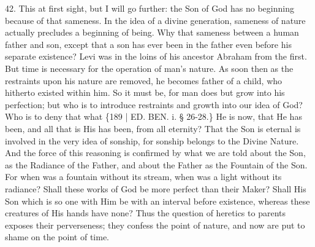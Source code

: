 42. This at first sight, but I
will go further: the Son of God has no beginning because of that
sameness. In the idea of a divine generation, sameness of nature
actually precludes a beginning of being. Why that sameness between a
human father and son, except that a son has ever been in the father
even before his separate existence? Levi was in the loins of his
ancestor Abraham from the first. But time is necessary for the
operation of man's nature. As soon then as the restraints upon his
nature are removed, he becomes father of a child, who hitherto existed
within him. So it must be, for man does but grow into his perfection;
but who is to introduce restraints and growth into our idea of God?
Who is to deny that what \{189 | ED.
BEN. i. § 26-28.\} He is now, that He has been,
and all that is His has been, from all eternity? That the Son is
eternal is involved in the very idea of sonship, for sonship belongs
to the Divine Nature. And the force of this reasoning is confirmed by
what we are told about the Son, as the Radiance of the Father, and
about the Father as the Fountain of the Son. For when was a fountain
without its stream, when was a light without its radiance? Shall these
works of God be more perfect than their Maker? Shall His Son which is
so one with Him be with an interval before existence, whereas these
creatures of His hands have none? Thus the question of heretics to
parents exposes their perverseness; they confess the point of nature,
and now are put to shame on the point of time.

